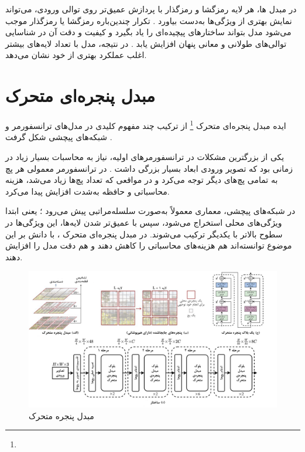 در مبدل ها، هر لایه رمزگشا و رمزگذار با پردازش عمیق‌تر روی توالی ورودی، می‌تواند نمایش بهتری از ویژگی‌ها به‌دست بیاورد \cite{vaswani2017attention}. تکرار چندین‌باره رمزگشا یا رمزگذار موجب می‌شود مدل بتواند ساختارهای پیچیده‌ای را یاد بگیرد و کیفیت و دقت آن در شناسایی توالی‌های طولانی و معانی پنهان افزایش یابد \cite{vaswani2017attention,dosovitskiy2020image}. 
در نتیجه، مدل با تعداد لایه‌های بیشتر اغلب عملکرد بهتری از خود نشان می‌دهد.

   
   
\section{مبدل پنجره‌ای متحرک}
ایده مبدل پنجره‌ای متحرک \footnote{} از ترکیب چند مفهوم کلیدی در مدل‌های ترانسفورمر و شبکه‌های پیچشی شکل گرفت \cite{vaswani2017attention,he2016deep,liu2021swintransformer}.

یکی از بزرگترین مشکلات در ترانسفورمرهای اولیه، نیاز به محاسبات بسیار زیاد در زمانی بود که تصویر ورودی ابعاد بسیار بزرگی داشت \cite{dosovitskiy2020image}. در ترانسفورمر معمولی هر پچ به تمامی پچ‌های دیگر توجه  می‌کرد و در مواقعی که تعداد پچ‌ها زیاد می‌شد، هزینه محاسباتی و حافظه به‌شدت افزایش پیدا می‌کرد.

در شبکه‌های پیچشی، معماری معمولاً به‌صورت سلسله‌مراتبی پیش می‌رود \cite{he2016deep}؛ یعنی ابتدا ویژگی‌های محلی استخراج می‌شود، سپس با عمیق‌تر شدن لایه‌ها، این ویژگی‌ها در سطوح بالاتر با یکدیگر ترکیب می‌شوند. در مبدل پنجره‌ای متحرک \cite{liu2021swintransformer}، با دانش بر این موضوع توانسته‌اند هم هزینه‌های محاسباتی را کاهش دهند و هم دقت مدل را افزایش دهند.

\begin{figure}[h]
	\centering
	\begin{minipage}[b]{1\textwidth}
		\centering
		\includegraphics[width=\textwidth]{transformer_images/persian images/b11_3.png}
		\caption{مبدل پنجره متحرک}
		\label{fig: swin transformer}
	\end{minipage}
	\hfill
\end{figure}

